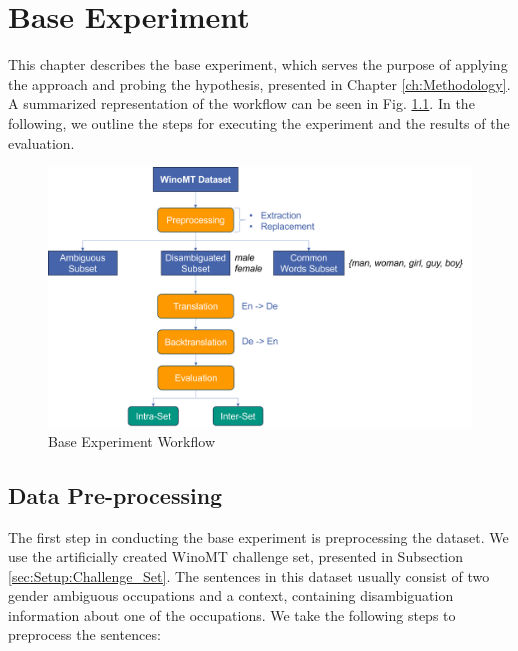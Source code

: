 \chapter{Base Experiment}
\label{ch:Base_Experiment}

This chapter describes the base experiment, which serves the purpose of applying the approach and probing the hypothesis, presented in Chapter \ref{ch:Methodology}. A summarized representation of the workflow can be seen in Fig. \ref{fig:base_workflow}. In the following, we outline the steps for executing the experiment and the results of the evaluation.

\begin{figure}
  \centering
  \includegraphics[scale=0.55]{figures/base_workflow.png}
  \caption{Base Experiment Workflow}
  \label{fig:base_workflow}
\end{figure}

\section{Data Pre-processing}
\label{sec:Base_Experiment:Pre-processing}
The first step in conducting the base experiment is preprocessing the dataset. We use the artificially created WinoMT challenge set, presented in Subsection \ref{sec:Setup:Challenge_Set}. The sentences in this dataset usually consist of two gender ambiguous occupations and a context, containing disambiguation information about one of the occupations. We take the following steps to preprocess the sentences:

